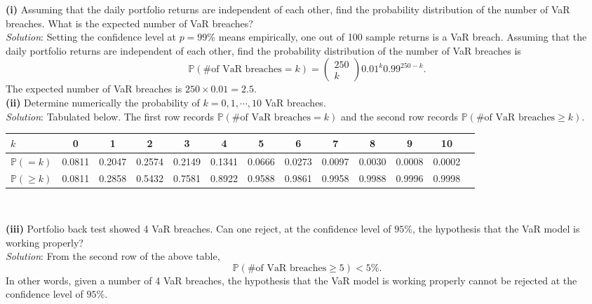 \documentclass[paper=a4, fontsize=11pt]{scrartcl} %
\numberwithin{equation}{section} %
\numberwithin{figure}{section} %
\numberwithin{table}{section} %
\begin{document}
\textbf{(i)} Assuming that the daily portfolio returns are independent of each other,
find the probability distribution of the number of VaR breaches. What
is the expected number of VaR breaches?\\
\textit{Solution}: Setting the confidence level at $p = 99\%$ means empirically, one
out of 100 sample returns is a VaR breach. Assuming that the daily portfolio returns 
are independent of each other, find the probability distribution of the number of VaR 
breaches is
$$
 \mathbb{P}(\text{\# of VaR breaches} = k ) = \begin{pmatrix}
250\\ k
\end{pmatrix}  0.01^k 0.99^{250-k}.
$$
The expected number of VaR breaches is $250\times 0.01 = 2.5$.\\

\textbf{(ii)} Determine numerically the probability of $k = 0, 1, \cdots, 10$ VaR breaches.\\
\textit{Solution}: Tabulated below. The first row records $ \mathbb{P}(\text{\# of VaR breaches} = k )$
and the second row records $\mathbb{P}(\text{\# of VaR breaches} \ge k )$.
\begin{center}
\footnotesize{
\begin{tabular}{l*{11}{c}r}
\hline
$k$              & 0 & 1 & 2 & 3 & 4  & 5 & 6 & 7 & 8 & 9 & 10 \\
\hline
$\mathbb{P}(=k )$ & 0.0811 & 0.2047 & 0.2574 & 0.2149 & 0.1341 & 0.0666 & 0.0273 & 0.0097 & 0.0030 & 0.0008 & 0.0002 \\
\hline
$\mathbb{P}(\ge k )$ & 0.0811 & 0.2858 & 0.5432 & 0.7581 & 0.8922 & 0.9588 & 0.9861 & 0.9958 & 0.9988 & 0.9996 & 0.9998 \\
\hline
\end{tabular}
}\\
\end{center}


\textbf{(iii)} Portfolio back test showed 4 VaR breaches. Can one reject, at the
confidence level of $95\%$, the hypothesis that the VaR model is working
properly?\\
\textit{Solution}: From the second row of the above table,
$$
\mathbb{P}(\text{\# of VaR breaches} \ge 5 ) < 5\%.
$$
In other words, given a number of 4 VaR breaches, the hypothesis that the VaR model is working
properly cannot be rejected at the
confidence level of $95\%$.
\end{document}
